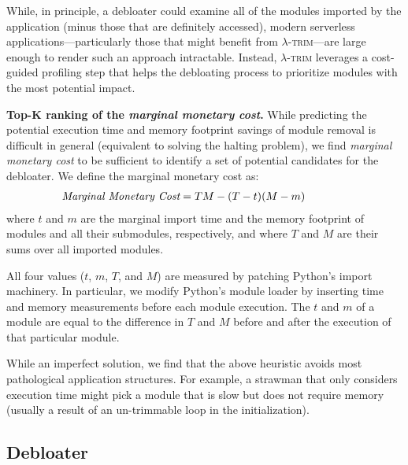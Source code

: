 \documentclass[sigplan,screen]{acmart}
\newcommand{\sys}{\textsc{\ensuremath{\lambda}-trim}\xspace}
\newcommand{\heading}[1]{\vspace{4pt}\noindent\textbf{#1.}}
\newcounter{example}
\begin{document}
While, in principle, a debloater could examine all of the modules imported by the application (minus those that are definitely accessed), modern serverless applications---particularly those that might benefit from \sys---are large enough to render such an approach intractable.
Instead, \sys leverages a cost-guided profiling step that helps the debloating process to prioritize modules with the most potential impact.

\heading{Top-K ranking of the \textit{marginal monetary cost}}
While predicting the potential execution time and memory footprint savings of module removal is difficult in general (equivalent to solving the halting problem), 
we find \textit{marginal monetary cost} to be sufficient to identify a set of potential candidates for the debloater.
We define the marginal monetary cost as:
\vspace{-0.15em}
\begin{align}
\hspace*{-1cm} \textit{Marginal Monetary Cost} &= T M - (T-t)(M-m)\label{eq:impact}
\end{align}
where $t$ and $m$ are the marginal import time and the memory footprint of modules and all their submodules, respectively, and where $T$ and $M$ are their sums over all imported modules.

All four values ($t$, $m$, $T$, and $M$) are measured by patching Python's import machinery.
In particular, we modify Python's module loader by inserting time and memory measurements before each module execution.
The $t$ and $m$ of a module are equal to the difference in $T$ and $M$ before and after the execution of that particular module.

While an imperfect solution, we find that the above heuristic avoids most pathological application structures.
For example, a strawman that only considers execution time might pick a module that is slow but does not require memory (usually a result of an un-trimmable loop in the initialization).






















 
\subsection{Debloater}\label{sec:debloat}
\end{document}
